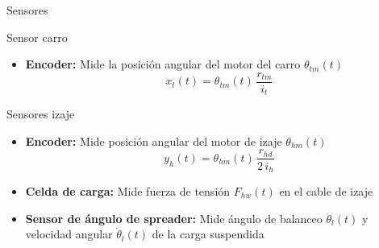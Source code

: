 
\begin{frame}{Sensores}
  \begin{block}{Sensor carro}
    \begin{itemize}
    \item \textbf{Encoder:} Mide la posición angular del motor del carro $\theta_{tm}(t)$
    \[
  x_t(t) = \theta_{tm}(t) \, \frac{r_{tm}}{i_t}
    \]
    \end{itemize}
  \end{block}
  \begin{block}{Sensores izaje}
    \begin{itemize}
    \item \textbf{Encoder:} Mide posición angular del motor de izaje $\theta_{hm}(t)$
    \[
    y_h(t) = \theta_{hm}(t) \, \frac{r_{hd}}{2\,i_h}
    \]
    \item \textbf{Celda de carga:} Mide fuerza de tensión $F_{hw}(t)$ en el cable de izaje
    \item \textbf{Sensor de ángulo de spreader:} Mide ángulo de balanceo $\theta_l(t)$ y velocidad angular $\dot{\theta}_l(t)$ 
    de la carga suspendida
    \end{itemize}
  \end{block}
\end{frame}

